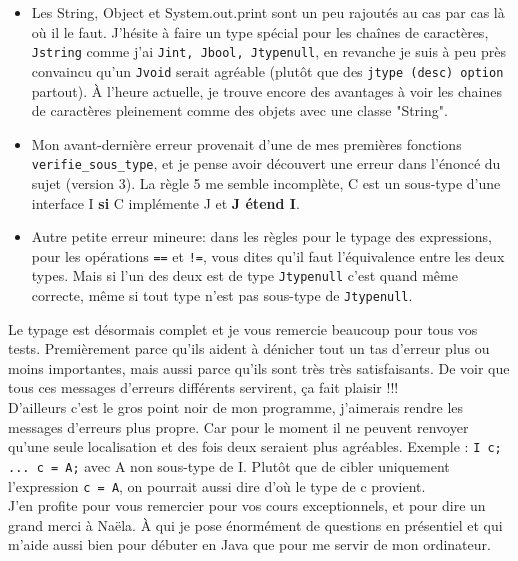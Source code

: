 \documentclass[12pt,a4paper]{report}
\begin{document}
\begin{itemize}
\item Les String, Object et System.out.print sont un peu rajoutés au cas par cas là où il le faut. J'hésite à faire un type spécial pour les chaînes de caractères, \texttt{Jstring} comme j'ai \texttt{Jint, Jbool, Jtypenull}, en revanche je suis à peu près convaincu qu'un \texttt{Jvoid} serait agréable (plutôt que des \texttt{jtype (desc) option} partout). À l'heure actuelle, je trouve encore des avantages à voir les chaines de caractères pleinement comme des objets avec une classe "String".
\item Mon avant-dernière erreur provenait d'une de mes premières fonctions \texttt{verifie\_sous\_type}, et je pense avoir découvert une erreur dans l'énoncé du sujet (version 3). La règle 5 me semble incomplète, C est un sous-type d'une interface I \textbf{si} C implémente J et \textbf{J étend I}.
\item Autre petite erreur mineure: dans les règles pour le typage des expressions, pour les opérations \texttt{==} et \texttt{!=}, vous dites qu'il faut l'équivalence entre les deux types. Mais si l'un des deux est de type \texttt{Jtypenull} c'est quand même correcte, même si tout type n'est pas sous-type de \texttt{Jtypenull}. 
\end{itemize}

Le typage est désormais complet et je vous remercie beaucoup pour tous vos tests. Premièrement parce qu'ils aident à dénicher tout un tas d'erreur plus ou moins importantes, mais aussi parce qu'ils sont très très satisfaisants. De voir que tous ces messages d'erreurs différents servirent, ça fait plaisir !!! \\ 
D'ailleurs c'est le gros point noir de mon programme, j'aimerais rendre les messages d'erreurs plus propre. Car pour le moment il ne peuvent renvoyer qu'une seule localisation et des fois deux seraient plus agréables. Exemple : \texttt{I c; ... c = A;} avec A non sous-type de I. Plutôt que de cibler uniquement l'expression \texttt{c = A}, on pourrait aussi dire d'où le type de c provient. \\

J'en profite pour vous remercier pour vos cours exceptionnels, et pour dire un grand merci à Naëla. À qui je pose énormément de questions en présentiel et qui m'aide aussi bien pour débuter en Java que pour me servir de mon ordinateur.
\end{document}
